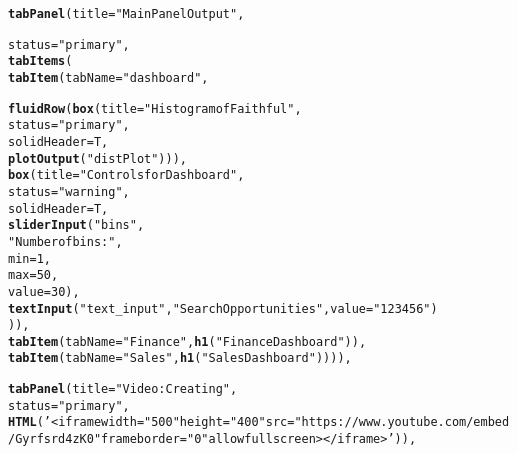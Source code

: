 \documentclass{article}\usepackage[]{graphicx}\usepackage[]{color}
\makeatletter
\newcommand{\hlnum}[1]{\textcolor[rgb]{0.686,0.059,0.569}{#1}}%
\newcommand{\hlstr}[1]{\textcolor[rgb]{0.192,0.494,0.8}{#1}}%
\newcommand{\hlstd}[1]{\textcolor[rgb]{0.345,0.345,0.345}{#1}}%
\newcommand{\hlkwc}[1]{\textcolor[rgb]{0.333,0.667,0.333}{#1}}%
\newcommand{\hlkwd}[1]{\textcolor[rgb]{0.737,0.353,0.396}{\textbf{#1}}}%
\newenvironment{kframe}{%
 \def\at@end@of@kframe{}%
 \ifinner\ifhmode%
  \def\at@end@of@kframe{\end{minipage}}%
  \begin{minipage}{\columnwidth}%
 \fi\fi%
 \def\FrameCommand##1{\hskip\@totalleftmargin \hskip-\fboxsep
 \colorbox{shadecolor}{##1}\hskip-\fboxsep
     \hskip-\linewidth \hskip-\@totalleftmargin \hskip\columnwidth}%
 \MakeFramed {\advance\hsize-\width
   \@totalleftmargin\z@ \linewidth\hsize
   \@setminipage}}%
 {\par\unskip\endMakeFramed%
 \at@end@of@kframe}
\newenvironment{knitrout}{}{} %
\makeatother
\begin{document}
\begin{knitrout}
\begin{kframe}
\begin{alltt}
               \hlkwd{tabPanel}\hlstd{(}\hlkwc{title}\hlstd{=}\hlstr{"Main Panel Output"}\hlstd{,}

                        \hlkwc{status}\hlstd{=}\hlstr{"primary"}\hlstd{,}
                        \hlkwd{tabItems}\hlstd{(}
                                    \hlkwd{tabItem}\hlstd{(}\hlkwc{tabName}\hlstd{=}\hlstr{"dashboard"}\hlstd{,}

                                               \hlkwd{fluidRow}\hlstd{(}\hlkwd{box}\hlstd{(}\hlkwc{title}\hlstd{=}\hlstr{"Histogram of Faithful"}\hlstd{,}
                                                            \hlkwc{status}\hlstd{=}\hlstr{"primary"}\hlstd{,}
                                                            \hlkwc{solidHeader}\hlstd{=T,}
                                                            \hlkwd{plotOutput}\hlstd{(}\hlstr{"distPlot"}\hlstd{))),}
                                                        \hlkwd{box}\hlstd{(}\hlkwc{title}\hlstd{=}\hlstr{"Controls for Dashboard"}\hlstd{,}
                                                            \hlkwc{status}\hlstd{=}\hlstr{"warning"}\hlstd{,}
                                                            \hlkwc{solidHeader}\hlstd{=T,}
                                                            \hlkwd{sliderInput}\hlstd{(}\hlstr{"bins"}\hlstd{,}
                                                                        \hlstr{"Number of bins:"}\hlstd{,}
                                                                        \hlkwc{min} \hlstd{=} \hlnum{1}\hlstd{,}
                                                                        \hlkwc{max} \hlstd{=} \hlnum{50}\hlstd{,}
                                                                        \hlkwc{value} \hlstd{=} \hlnum{30}\hlstd{),}
                                                            \hlkwd{textInput}\hlstd{(}\hlstr{"text_input"}\hlstd{,}\hlstr{"Search Opportunities"}\hlstd{,} \hlkwc{value}\hlstd{=}\hlstr{"123456"}\hlstd{)}
                                              \hlstd{)),}
                                      \hlkwd{tabItem}\hlstd{(}\hlkwc{tabName}\hlstd{=}\hlstr{"Finance"}\hlstd{,} \hlkwd{h1}\hlstd{(}\hlstr{"Finance Dashboard"}\hlstd{)),}
                                      \hlkwd{tabItem}\hlstd{(}\hlkwc{tabName}\hlstd{=}\hlstr{"Sales"}\hlstd{,} \hlkwd{h1}\hlstd{(}\hlstr{"Sales Dashboard"}\hlstd{)))),}

               \hlkwd{tabPanel}\hlstd{(}\hlkwc{title}\hlstd{=}\hlstr{"Video: Creating"}\hlstd{,}
                        \hlkwc{status}\hlstd{=}\hlstr{"primary"}\hlstd{,}
                        \hlkwd{HTML}\hlstd{(}\hlstr{'<iframe width="500" height="400" src="https://www.youtube.com/embed/Gyrfsrd4zK0" frameborder="0" allowfullscreen></iframe>'}\hlstd{)),}


\end{alltt}
\end{kframe}
\end{knitrout}
\end{document}

